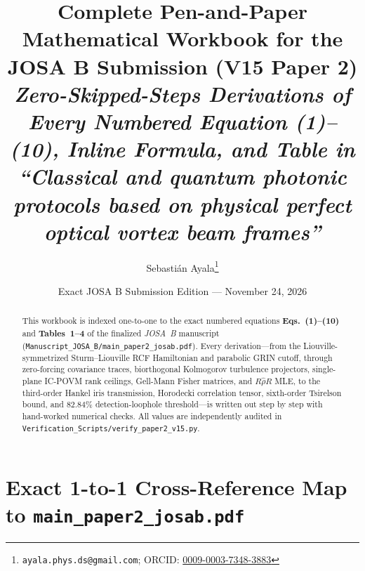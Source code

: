 \documentclass[10pt,letterpaper]{article}
\title{\vspace{-1.0cm}\textbf{\Large Complete Pen-and-Paper Mathematical Workbook for the JOSA B Submission (V15 Paper 2)}\\[0.35em]
\large\textit{Zero-Skipped-Steps Derivations of Every Numbered Equation (1)--(10), Inline Formula, and Table in\\
``Classical and quantum photonic protocols based on physical perfect optical vortex beam frames''}}
\author{Sebasti\'an Ayala\thanks{\texttt{ayala.phys.ds@gmail.com}; ORCID: \href{https://orcid.org/0009-0003-7348-3883}{0009-0003-7348-3883}}}
\date{Exact JOSA B Submission Edition --- November 24, 2026}
\numberwithin{equation}{section}
\begin{document}
\maketitle
\thispagestyle{plain}

\begin{abstract}
\noindent This workbook is indexed one-to-one to the exact numbered equations \textbf{Eqs.~(1)--(10)} and \textbf{Tables~1--4} of the finalized \emph{JOSA~B} manuscript (\texttt{Manuscript\_JOSA\_B/main\_paper2\_josab.pdf}). Every derivation---from the Liouville-symmetrized Sturm--Liouville RCF Hamiltonian and parabolic GRIN cutoff, through zero-forcing covariance traces, biorthogonal Kolmogorov turbulence projectors, single-plane IC-POVM rank ceilings, Gell-Mann Fisher matrices, and $R\hat{\rho}R$ MLE, to the third-order Hankel iris transmission, Horodecki correlation tensor, sixth-order Tsirelson bound, and $82.84\%$ detection-loophole threshold---is written out step by step with hand-worked numerical checks. All values are independently audited in \texttt{Verification\_Scripts/verify\_paper2\_v15.py}.
\end{abstract}

\tableofcontents
\vspace{0.5em}

\section*{Exact 1-to-1 Cross-Reference Map to \texttt{main\_paper2\_josab.pdf}}
\end{document}
